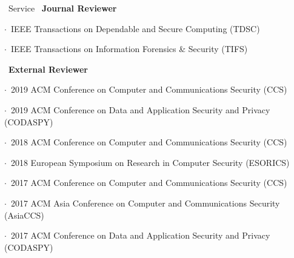 \documentclass{resume} %
\begin{document}
\begin{rSection}{\faGenderless~Service}
    \textbullet~{\bf Journal Reviewer} \\
        \strut\hspace{1cm}$\cdot$~IEEE Transactions on Dependable and Secure Computing (TDSC)\\
        \strut\hspace{1cm}$\cdot$~IEEE Transactions on Information Forensics \& Security (TIFS)

	\textbullet~{\bf External Reviewer} \\
        \strut\hspace{1cm}$\cdot$~2019 ACM Conference on Computer and Communications Security (CCS)\\
        \strut\hspace{1cm}$\cdot$~2019 ACM Conference on Data and Application Security and Privacy (CODASPY)\\
		\strut\hspace{1cm}$\cdot$~2018 ACM Conference on Computer and Communications Security (CCS)\\
		\strut\hspace{1cm}$\cdot$~2018 European Symposium on Research in Computer Security (ESORICS)\\
		\strut\hspace{1cm}$\cdot$~2017 ACM Conference on Computer and Communications Security (CCS)\\
		\strut\hspace{1cm}$\cdot$~2017 ACM Asia Conference on Computer and Communications Security (AsiaCCS) \\
		\strut\hspace{1cm}$\cdot$~2017 ACM Conference on Data and Application Security and Privacy (CODASPY)

	\vspace{3mm}
\end{rSection}
\end{document}
